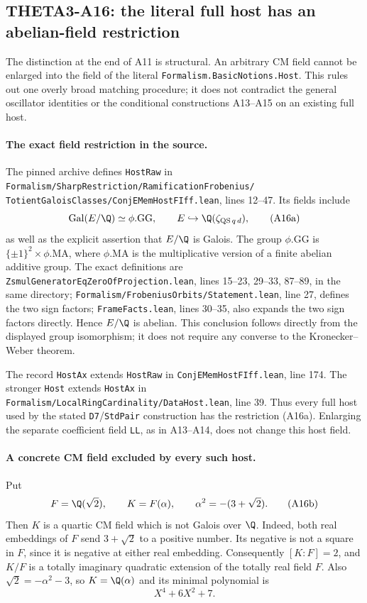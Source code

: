 \subsection{THETA3-A16: the literal full host has an abelian-field restriction}\label{A16}

The distinction at the end of A11 is structural. An arbitrary
CM field cannot be enlarged into the field of the literal
\texttt{Formalism.BasicNotions.Host}. This rules out one
overly broad matching procedure; it does not contradict the
general oscillator identities or the conditional constructions
A13--A15 on an existing full host.

\paragraph{The exact field restriction in the source.}
The pinned archive defines \texttt{HostRaw} in
\texttt{Formalism/SharpRestriction/RamificationFrobenius/}
\texttt{TotientGaloisClasses/ConjEMemHostFIff.lean},
lines 12--47. Its fields include
\[
 \operatorname{Gal}(E/\Q)\simeq\phi.\mathrm{GG},
 \qquad
 E\hookrightarrow\Q(\zeta_{\mathrm{QS}\,q\,d}),
 \tag{A16a}
\]
as well as the explicit assertion that $E/\Q$ is Galois.
The group $\phi.\mathrm{GG}$ is
$\{\pm1\}^2\times\phi.\mathrm{MA}$, where
$\phi.\mathrm{MA}$ is the multiplicative version of a finite
abelian additive group. The exact definitions are
\texttt{ZsmulGeneratorEqZeroOfProjection.lean},
lines 15--23, 29--33, 87--89, in the same directory;
\texttt{Formalism/FrobeniusOrbits/Statement.lean},
line 27, defines the two sign factors;
\texttt{FrameFacts.lean}, lines 30--35, also expands the
two sign factors directly. Hence $E/\Q$ is abelian.
This conclusion follows directly from the displayed group
isomorphism; it does not require any converse to the
Kronecker--Weber theorem.

The record \texttt{HostAx} extends \texttt{HostRaw} in
\texttt{ConjEMemHostFIff.lean}, line 174. The stronger
\texttt{Host} extends \texttt{HostAx} in
\texttt{Formalism/LocalRingCardinality/DataHost.lean},
line 39. Thus every full host used by the stated
\texttt{D7}/\texttt{StdPair} construction has the restriction
(A16a). Enlarging the separate coefficient field
\texttt{LL}, as in A13--A14, does not change this host field.

\paragraph{A concrete CM field excluded by every such host.}
Put
\[
 F=\Q(\sqrt2),\qquad
 K=F(\alpha),\qquad
 \alpha^2=-(3+\sqrt2).
 \tag{A16b}
\]
Then $K$ is a quartic CM field which is not Galois over
$\Q$. Indeed, both real embeddings of $F$ send
$3+\sqrt2$ to a positive number. Its negative is not
a square in $F$, since it is negative at either real
embedding. Consequently $[K:F]=2$, and $K/F$ is a
totally imaginary quadratic extension of the totally
real field $F$. Also $\sqrt2=-\alpha^2-3$, so
$K=\Q(\alpha)$ and its minimal polynomial is
\[
                     X^4+6X^2+7.
 \tag{A16c}
\]

